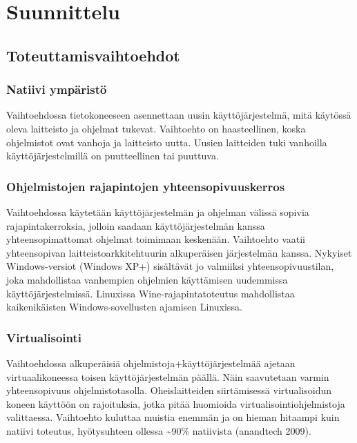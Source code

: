 \documentclass[]{article}
\begin{document}
\chapter{Suunnittelu}\label{suunnittelu}

\section{Toteuttamisvaihtoehdot}\label{toteuttamisvaihtoehdot}

\subsection{Natiivi ympäristö}\label{natiivi-ympuxe4ristuxf6}

Vaihtoehdossa tietokoneeseen asennettaan uusin käyttöjärjestelmä, mitä
käytössä oleva laitteisto ja ohjelmat tukevat. Vaihtoehto on
haasteellinen, koska ohjelmistot ovat vanhoja ja laitteisto uutta.
Uusien laitteiden tuki vanhoilla käyttöjärjestelmillä on puutteellinen
tai puuttuva.

\subsection{Ohjelmistojen rajapintojen
yhteensopivuuskerros}\label{ohjelmistojen-rajapintojen-yhteensopivuuskerros}

Vaihtoehdossa käytetään käyttöjärjestelmän ja ohjelman välissä sopivia
rajapintakerroksia, jolloin saadaan käyttöjärjestelmän kanssa
yhteensopimattomat ohjelmat toimimaan keskenään. Vaihtoehto vaatii
yhteensopivan laitteistoarkkitehtuurin alkuperäisen järjestelmän kanssa.
Nykyiset Windows-versiot (Windows XP+) sisältävät jo valmiiksi
yhteensopivuustilan, joka mahdollistaa vanhempien ohjelmien käyttämisen
uudemmissa käyttöjärjestelmissä. Linuxissa Wine-rajapintatoteutus
mahdollistaa kaikenikäisten Windows-sovellusten ajamisen Linuxissa.

\subsection{Virtualisointi}\label{virtualisointi}

Vaihtoehdossa alkuperäisiä ohjelmistoja+käyttöjärjestelmää ajetaan
virtuaalikoneessa toisen käyttöjärjestelmän päällä. Näin saavutetaan
varmin yhteensopivuus ohjelmistotasolla. Oheislaitteiden siirtämisessä
virtualisoidun koneen käyttöön on rajoituksia, jotka pitää huomioida
virtualisointiohjelmistoja valittaessa. Vaihtoehto kuluttaa muistia
enemmän ja on hieman hitaampi kuin natiivi toteutus, hyötysuhteen
ollessa \textasciitilde{}90\% natiivista (anandtech 2009).
\end{document}
